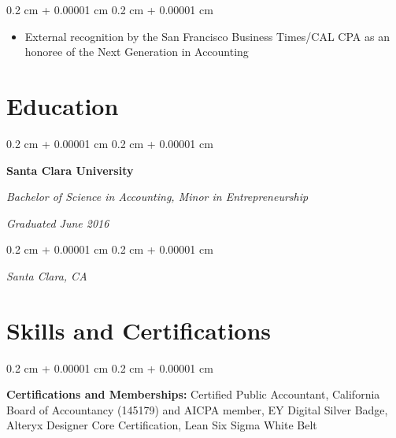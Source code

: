 \documentclass[10pt, letterpaper]{article}
\newenvironment{highlights}{
    \begin{itemize}[
        topsep=0.10 cm,
        parsep=0.10 cm,
        partopsep=0pt,
        itemsep=0pt,
        leftmargin=0.4 cm + 10pt
    ]
}{
    \end{itemize}
} %
\newenvironment{onecolentry}{
    \begin{adjustwidth}{
        0.2 cm + 0.00001 cm
    }{
        0.2 cm + 0.00001 cm
    }
}{
    \end{adjustwidth}
} %
\newenvironment{twocolentry}[2][]{
    \onecolentry
    \def\secondColumn{#2}
    \setcolumnwidth{\fill, 5.5 cm}
    \begin{paracol}{2}
}{
    \switchcolumn \raggedleft \secondColumn
    \end{paracol}
    \endonecolentry
} %
\begin{document}
\begin{onecolentry}
\begin{highlights}
                \item External recognition by the San Francisco Business Times/CAL CPA as an honoree of the Next Generation in Accounting
            \end{highlights}
        \end{onecolentry}




    
    \section{Education}

        \begin{twocolentry}{
            \textit{Graduated June 2016}}
            \textbf{Santa Clara University}

            \textit{Bachelor of Science in Accounting, Minor in Entrepreneurship}
        \end{twocolentry}

        \vspace{0.10 cm}
        \begin{onecolentry}
            \textit{Santa Clara, CA}
        \end{onecolentry}

    
    \section{Skills and Certifications}

        \begin{onecolentry}
            \textbf{Certifications and Memberships:} Certified Public Accountant, California Board of Accountancy (145179) and AICPA member, EY Digital Silver Badge, Alteryx Designer Core Certification, Lean Six Sigma White Belt
        \end{onecolentry}
\end{document}
